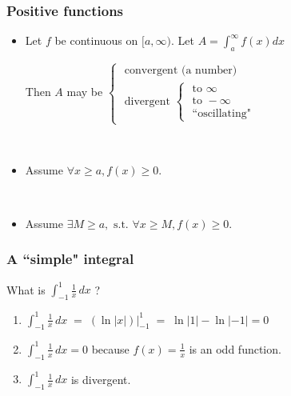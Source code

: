 \documentclass[14pt]{beamer}
\begin{document}
	\begin{frame}[t]
		\fontsize{13}{13}\selectfont
		\frametitle{Positive functions}

		\begin{itemize}
			\item Let $f$ be continuous on $[a, \infty)$. Let
				$\displaystyle A = \int_{a}^{\infty}f(x) dx$

				Then $A$ may be $\displaystyle
				\begin{cases}
					\text{ convergent (a number) }                                                                                  \\
					\text{ divergent } \begin{cases}\text{ to } \infty \\ \text{ to } - \infty \\ \text{ ``oscillating"}\end{cases}
				\end{cases}$

				\

			\item Assume $\displaystyle \forall x \geq a, f(x) \geq 0$.
				\vspace{.2cm}


				\

			\item Assume $\displaystyle \exists M \geq a, \text{ s.t. }\forall x \geq M
				, f(x) \geq 0$.
				\vspace{.2cm}

		\end{itemize}
	\end{frame}

	\begin{frame}[t]
		\frametitle{A ``simple" integral}

		What is $\displaystyle \int_{-1}^{1}\frac{1}{x}\, dx$ \; ?

		\begin{enumerate}
			\vfill

			\item $\displaystyle \int_{-1}^{1}\frac{1}{x}\, dx \; = \; \left( \ln |x| \right
				) \Big\vert_{-1}^{1}\; = \; \ln|1| - \ln|-1| = 0$
				\vfill

			\item $\displaystyle \int_{-1}^{1}\frac{1}{x}\, dx = 0$ \; because $\displaystyle
				f(x) = \frac{1}{x}$ is an odd function.
				\vfill

			\item $\displaystyle \int_{-1}^{1}\frac{1}{x}\, dx$ is divergent.
				\vfill
		\end{enumerate}
	\end{frame}
\end{document}
